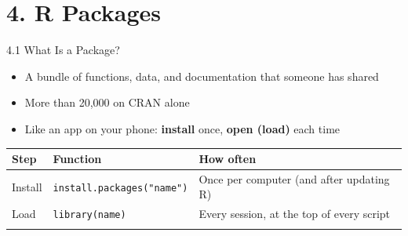 \documentclass[
  ignorenonframetext,
  aspectratio=169,
]{beamer}
\newcounter{none} %
\providecommand{\tightlist}{%
  \setlength{\itemsep}{0pt}\setlength{\parskip}{0pt}}
\begin{document}
\section{4. R Packages}\label{sec-packages}

\begin{frame}[fragile]{4.1 What Is a Package?}
\protect{}\label{what-is-a-package}
\begin{itemize}
\tightlist
\item
  A bundle of functions, data, and documentation that someone has shared
\item
  More than 20,000 on CRAN alone
\item
  Like an app on your phone: \textbf{install} once, \textbf{open (load)}
  each time
\end{itemize}

{\def\LTcaptype{none} %
\begin{longtable}[]{@{}
  >{\raggedright\arraybackslash}p{}
  >{\raggedright\arraybackslash}p{}
  >{\raggedright\arraybackslash}p{}@{}}
\toprule\noalign{}
\begin{minipage}[b]{\linewidth}\raggedright
Step
\end{minipage} & \begin{minipage}[b]{\linewidth}\raggedright
Function
\end{minipage} & \begin{minipage}[b]{\linewidth}\raggedright
How often
\end{minipage} \\
\midrule\noalign{}
\endhead
Install & \texttt{install.packages("name")} & Once per computer (and
after updating R) \\
Load & \texttt{library(name)} & Every session, at the top of every
script \\
\bottomrule\noalign{}
\end{longtable}
}
\end{frame}
\end{document}
